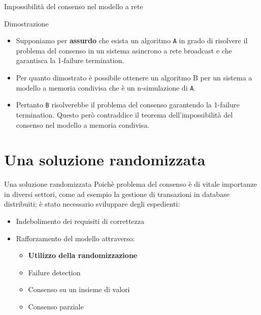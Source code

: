 \documentclass{beamer}
\begin{document}
\begin{frame}{Impossibilità del consenso nel modello a rete}
    \begin{block}{Dimostrazione}
    \begin{itemize}
        \item Supponiamo per \textbf{assurdo} che esista un algoritmo \texttt{A} in grado di risolvere il problema del consenso in un sistema asincrono a rete broadcast e che garantisca la 1-failure termination.
        \item Per quanto dimostrato è possibile ottenere un algoritmo B per un sistema a modello a memoria condivisa che è un n-simulazione di \texttt{A}.
        \item Pertanto \texttt{B} risolverebbe il problema del consenso garantendo la 1-failure termination. Questo però contraddice il teorema dell'impossibilità del consenso nel modello a memoria condivisa.
    \end{itemize}
    \end{block}
\end{frame}


\section{Una soluzione randomizzata}

\begin{frame}{Una soluzione randomizzata}
    Poichè problema del consenso è di vitale importanze in diversi settori, come ad esempio la gestione di transazioni in database distribuiti; è stato necessario sviluppare degli espedienti:
    \vspace{0.2cm}
    \begin{itemize}
        \item Indebolimento dei requisiti di correttezza
        \item Rafforzamento del modello attraverso:
        \vspace{0.2cm}
        
        \begin{itemize}
            \item \textbf{Utilizzo della randomizzazione}
            \item Failure detection
            \item Consenso su un insieme di valori
            \item Consenso parziale
        \end{itemize}
    \end{itemize}
\end{frame}
\end{document}
